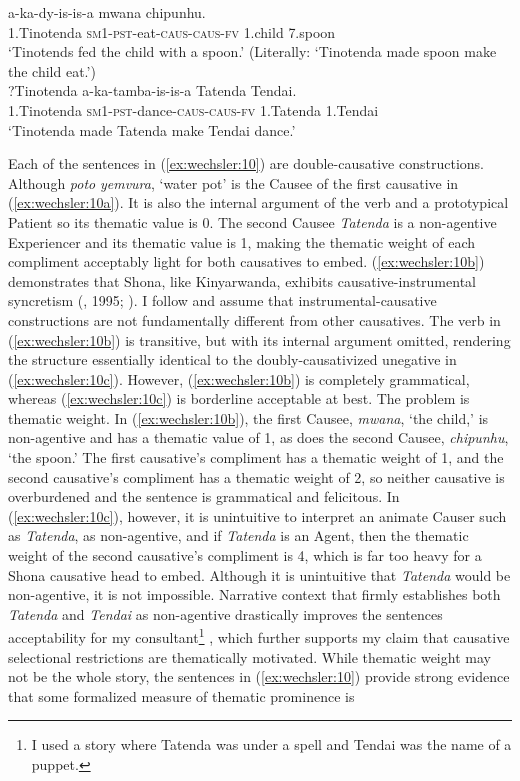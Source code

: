 \documentclass[output=paper,modfonts,nonflat,colorlinks,citecolor=brown]{langsci/langscibook}
\begin{document}
\ex\label{ex:wechsler:10b}  
 {a-ka-dy-is-is-a}  {{mwana}}  {{chipunhu}}.\\
 1.Tinotenda  \textsc{sm}1-\textsc{pst}{}-eat-\textsc{caus}{}-\textsc{caus}{}-\textsc{fv}  {1.child}  {7.spoon}\\
\glt `Tinotends fed the child with a spoon.’
(Literally: ‘Tinotenda made spoon make the child eat.’)\\

\ex\label{ex:wechsler:10c}
?{Tinotenda}  {{a-ka-tamba-is-is-a}}  {{Tatenda}}  {{Tendai}}.\\
 1.Tinotenda  {\textsc{sm}1-\textsc{pst}{}-dance-\textsc{caus}{}-\textsc{caus}{}-\textsc{fv}}  {1.Tatenda}  {1.Tendai}\\
\glt `Tinotenda made Tatenda make Tendai dance.'
\z
\z

Each of the sentences in (\ref{ex:wechsler:10}) are double-causative constructions. Although \textit{poto} \textit{yemvura}, ‘water pot’ is the Causee of the first causative in (\ref{ex:wechsler:10a}). It is also the internal argument of the verb and a prototypical Patient so its thematic value is 0. The second Causee \textit{Tatenda} is a non-agentive Experiencer and its thematic value is 1, making the thematic weight of each compliment acceptably light for both causatives to embed. (\ref{ex:wechsler:10b}) demonstrates that Shona, like Kinyarwanda, exhibits causative-instrumental syncretism (\citealt{Kimenyi1980}, 1995; \citealt{Peterson2007,Jerro2013}). I follow \citet{Jerro2013} and assume that instrumental-causative constructions are not fundamentally different from other causatives. The verb in (\ref{ex:wechsler:10b}) is transitive, but with its internal argument omitted, rendering the structure essentially identical to the doubly-causativized unegative in (\ref{ex:wechsler:10c}). However, (\ref{ex:wechsler:10b}) is completely grammatical, whereas (\ref{ex:wechsler:10c}) is borderline acceptable at best. The problem is thematic weight. In (\ref{ex:wechsler:10b}), the first Causee, \textit{mwana}, ‘the child,’ is non-agentive and has a thematic value of 1, as does the second Causee, \textit{chipunhu}, ‘the spoon.’ The first causative’s compliment has a thematic weight of 1, and the second causative’s compliment has a thematic weight of 2, so neither causative is overburdened and the sentence is grammatical and felicitous. In (\ref{ex:wechsler:10c}), however, it is unintuitive to interpret an animate Causer such as \textit{Tatenda}, as non-agentive, and if \textit{Tatenda} is an Agent, then the thematic weight of the second causative’s compliment is 4, which is far too heavy for a Shona causative head to embed. Although it is unintuitive that \textit{Tatenda} would be non-agentive, it is not impossible. Narrative context that firmly establishes both \textit{Tatenda} and \textit{Tendai} as non-agentive drastically improves the sentences acceptability for my consultant\footnote{I used a story where Tatenda was under a spell and Tendai was the name of a puppet.} , which further supports my claim that causative selectional restrictions are thematically motivated. While thematic weight may not be the whole story, the sentences in (\ref{ex:wechsler:10}) provide strong evidence that some formalized measure of thematic prominence is 
\end{document}
